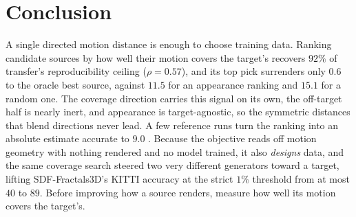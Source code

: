 \section{Conclusion}
\label{sec:conclusion}

A single directed motion distance is enough to choose training data. Ranking
candidate sources by how well their motion covers the target's recovers $92\%$ of
transfer's reproducibility ceiling ($\rho{=}0.57$), and its top pick surrenders only
$0.6$ \pck{} to the oracle best source, against $11.5$ for an appearance ranking and
$15.1$ for a random one. The coverage direction carries this signal on its own, the
off-target half is nearly inert, and appearance is target-agnostic, so the symmetric
distances that blend directions never lead. A few reference runs turn the ranking into
an absolute estimate accurate to $9.0$ \pck{}. Because the objective reads off motion
geometry with nothing rendered and no model trained, it also \emph{designs} data, and
the same coverage search steered two very different generators toward a target,
lifting SDF-Fractals3D's KITTI accuracy at the strict $1\%$ threshold from at most
$40$ to $89$. Before improving how a source renders, measure how well its motion
covers the target's.

